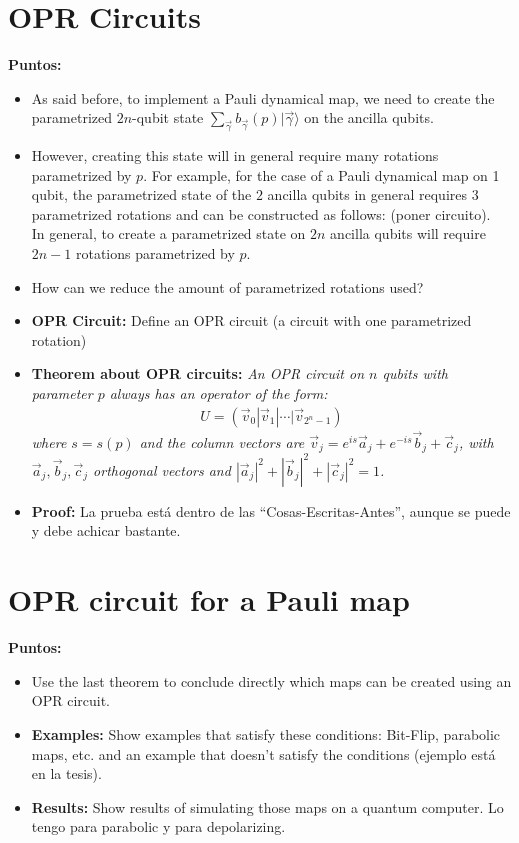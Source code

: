 \documentclass[10pt,letterpaper]{article}
\begin{document}
\section*{OPR Circuits}
\label{sec: OPR Circuits}
\textbf{Puntos:}
\begin{itemize}
\item As said before, to implement a Pauli dynamical map, 
we need to create the parametrized $2n$-qubit state 
$\sum_{\vec{\gamma}} b_{\vec{\gamma}}(p) |\vec{\gamma}\rangle$ on the ancilla qubits.
\item However, creating this state will in general require many rotations parametrized by $p$. 
For example, for the case of a Pauli dynamical map on 1 qubit, 
the parametrized state of the $2$ ancilla qubits in general requires $3$ parametrized rotations and can be constructed as follows: (poner circuito).\\
In general, to create a parametrized state on $2n$ ancilla qubits will require
$2n-1$ rotations parametrized by $p$.
\item How can we reduce the amount of parametrized rotations used?
\item \textbf{OPR Circuit:} Define an OPR circuit (a circuit with one parametrized rotation)
\item \textbf{Theorem about OPR circuits:} \textit{An OPR circuit on $n$ qubits with parameter $p$ always has an operator of the form:}
\begin{eqnarray}
U = (\vec{v}_0| \vec{v}_1| \cdots| \vec{v}_{2^n-1})
\end{eqnarray}
\textit{where $s = s(p)$ and the column vectors are $\vec{v}_j = e^{is} \vec{a}_j + e^{-is} \vec{b}_j + \vec{c}_j$, with $\vec{a}_j, \vec{b}_j, \vec{c}_j$ orthogonal vectors and $|\vec{a}_j|^2 + |\vec{b}_j|^2 + |\vec{c}_j|^2 = 1$.}
\item \textbf{Proof:} La prueba está dentro de las ``Cosas-Escritas-Antes'', 
aunque se puede y debe achicar bastante.
\end{itemize}

\section*{OPR circuit for a Pauli map}
\label{sec: OPR circuit for a Pauli map}
\textbf{Puntos:}
\begin{itemize}
\item Use the last theorem to conclude directly which maps can be created using an OPR circuit.
\item \textbf{Examples:} Show examples that satisfy these conditions: Bit-Flip, parabolic maps, etc. 
and an example that doesn't satisfy the conditions (ejemplo está en la tesis).
\item \textbf{Results:} Show results of simulating those maps on a quantum computer. 
Lo tengo para parabolic y para depolarizing.
\end{itemize}
\end{document}
